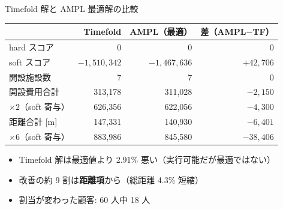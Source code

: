 \documentclass[aspectratio=169,11pt]{beamer}
\begin{document}
\begin{frame}{Timefold 解と AMPL 最適解の比較}
  \small
  \begin{tabularx}{\textwidth}{L R R R}
    \toprule
    & Timefold & AMPL（最適） & 差（AMPL$-$TF） \\
    \midrule
    hard スコア & 0 & 0 & 0 \\
    soft スコア & $-1{,}510{,}342$ & $-1{,}467{,}636$ & $+42{,}706$ \\
    開設施設数 & 7 & 7 & 0 \\
    開設費用合計 & 313,178 & 311,028 & $-2{,}150$ \\
    \quad $\times 2$（soft 寄与） & 626,356 & 622,056 & $-4{,}300$ \\
    距離合計 [m] & 147,331 & 140,930 & $-6{,}401$ \\
    \quad $\times 6$（soft 寄与） & 883,986 & 845,580 & $-38{,}406$ \\
    \bottomrule
  \end{tabularx}
  \vspace{0.8em}
  \begin{itemize}
    \item Timefold 解は最適値より \alert{2.91\%} 悪い（実行可能だが最適ではない）
    \item 改善の約 9 割は\textbf{距離項}から（総距離 4.3\% 短縮）
    \item 割当が変わった顧客: 60 人中 18 人
  \end{itemize}
\end{frame}
\end{document}
